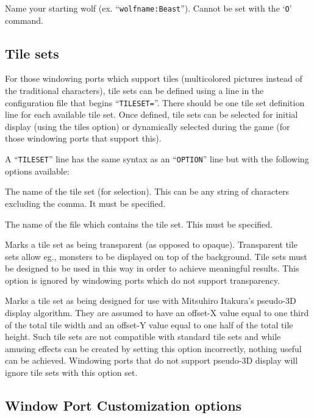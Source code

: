 \item[\ib{wolfname}]
Name your starting wolf (ex. ``{\tt wolfname:Beast}'').
Cannot be set with the `{\tt O}' command.
\elist
\nd %
\subsection*{Tile sets}


For those windowing ports which support tiles (multicolored pictures
instead of the traditional characters), tile sets can be defined using
a line in the configuration file that begins ``{\tt TILESET=}''. There should
be one tile set definition line for each available tile set. Once defined,
tile sets can be selected for initial display (using the tiles option) or
dynamically selected during the game (for those windowing ports that
support this).

A ``{\tt TILESET}'' line has the same syntax as an ``{\tt OPTION}'' line but with
the following options available:
\blist{}

\item[\ib{name}]
The name of the tile set (for selection). This can be any string of characters
excluding the comma. It must be specified.

\item[\ib{file}]
The name of the file which contains the tile set. This must be specified.

\item[\ib{transparent}]
Marks a tile set as being transparent (as opposed to opaque). Transparent
tile sets allow eg., monsters to be displayed on top of the background.
Tile sets must be designed to be used in this way in order to achieve
meaningful results. This option is ignored by windowing ports which do
not support transparency.

\item[\ib{pseudo3D}]
Marks a tile set as being designed for use with Mitsuhiro Itakura's
pseudo-3D display algorithm. They are assumed to have an offset-X value
equal to one third of the total tile width and an offset-Y value equal
to one half of the total tile height. Such tile sets are not compatible
with standard tile sets and while amusing effects can be created by
setting this option incorrectly, nothing useful can be achieved. Windowing
ports that do not support pseudo-3D display will ignore tile sets with
this option set.
\elist
\nd %
\subsection*{Window Port Customization options}

